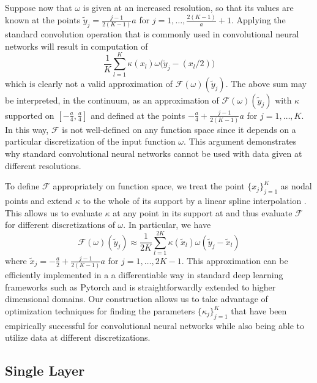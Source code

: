 \documentclass[preprint,11pt]{elsarticle}
\theoremstyle{plain}
\begin{document}
Suppose now that $\omega$ is given at an increased resolution, so that its values are known at the points $\tilde{y}_j = \frac{j-1}{2(K-1)}a$ for $j=1,\dots,\frac{2(K-1)}{a} + 1$. Applying the standard convolution operation that is commonly used in convolutional neural networks \cite{paszke2019pytorch} will result in computation of
\begin{equation}
    \frac{1}{K} \sum_{l=1}^K \kappa(x_l) \omega \big( \tilde{y}_j - (x_l /2) \big )
\end{equation}
which is clearly not a valid approximation of $\mathcal{F}(\omega)(\tilde{y}_j)$. The above sum may be interpreted, in the continuum, as an approximation of $\mathcal{F}(\omega)(\tilde{y}_j)$ with $\kappa$ supported on $[-\frac{a}{4}, \frac{a}{4}]$ and defined at the points $-\frac{a}{4} + \frac{j-1}{2(K-1)}a$ for $j=1,\dots,K$. In this way, $\mathcal{F}$  is not well-defined on any function space since it depends on a particular discretization of the input function $\omega$. This argument demonstrates why standard convolutional neural networks cannot be used with data given at different resolutions.

To define $\mathcal{F}$ appropriately on function space, we treat the point $\{x_j\}_{j=1}^K$ as nodal points and extend $\kappa$ to the whole of its support by a linear spline interpolation \cite{devore1993constructive}. This allows us to evaluate $\kappa$ at any point in its support at and thus evaluate $\mathcal{F}$ for different discretizations of $\omega$. In particular, we have
\begin{equation}
    \mathcal{F}(\omega)(\tilde{y}_j) \approx \frac{1}{2K} \sum_{l=1}^{2K} \kappa(\tilde{x}_l) \omega (\tilde{y}_j - \tilde{x}_l)
\end{equation}
where $\tilde{x}_j = -\frac{a}{2} + \frac{j-1}{2(K-1)}a$ for $j=1,\dots,2K-1$. This approximation can be efficiently implemented in a a differentiable way in standard deep learning frameworks such as Pytorch \cite{paszke2019pytorch} and is straightforwardly extended to higher dimensional domains. Our construction allows us to take advantage of optimization techniques for finding the parameters $\{\kappa_j\}_{j=1}^K$ that have been empirically successful for convolutional neural networks while also being able to utilize data at different discretizations.

\subsection{Single Layer}
\end{document}

